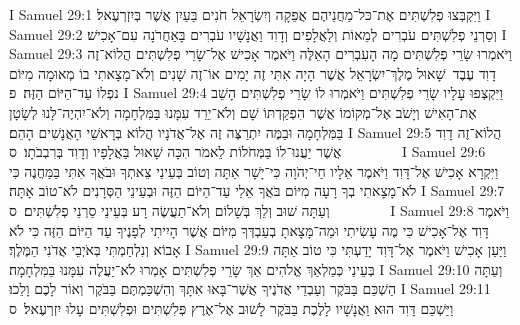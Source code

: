 I Samuel 29:1	וַיִּקְבְּצוּ פְלִשְׁתִּים אֶת־כּל־מַחֲנֵיהֶם אֲפֵקָה וְיִשְׂרָאֵל חֹנִים בַּעַיִן אֲשֶׁר בְּיִזְרְעֶאל׃
I Samuel 29:2	וְסַרְנֵי פְלִשְׁתִּים עֹבְרִים לְמֵאוֹת וְלַאֲלָפִים וְדָוִד וַאֲנָשָׁיו עֹבְרִים בָּאַחֲרֹנָה עִם־אָכִישׁ׃
I Samuel 29:3	וַיֹּאמְרוּ שָׂרֵי פְלִשְׁתִּים מָה הָעִבְרִים הָאֵלֶּה וַיֹּאמֶר אָכִישׁ אֶל־שָׂרֵי פְלִשְׁתִּים הֲלוֹא־זֶה דָוִד עֶבֶד  שָׁאוּל מֶלֶךְ־יִשְׂרָאֵל אֲשֶׁר הָיָה אִתִּי זֶה יָמִים אוֹ־זֶה שָׁנִים וְלֹא־מָצָאתִי בוֹ מְאוּמָה מִיּוֹם נפְלוֹ עַד־הַיּוֹם הַזֶּה׃ {פ}
I Samuel 29:4	וַיִּקְצְפוּ עָלָיו שָׂרֵי פְלִשְׁתִּים וַיֹּאמְרוּ לוֹ שָׂרֵי פְלִשְׁתִּים הָשֵׁב אֶת־הָאִישׁ וְיָשֹׁב אֶל־מְקוֹמוֹ אֲשֶׁר הִפְקַדְתּוֹ שָׁם וְלֹא־יֵרֵד עִמָּנוּ בַּמִּלְחָמָה וְלֹא־יִהְיֶה־לָּנוּ לְשָׂטָן בַּמִּלְחָמָה וּבַמֶּה יִתְרַצֶּה זֶה אֶל־אֲדֹנָיו הֲלוֹא בְּרָאשֵׁי הָאֲנָשִׁים הָהֵם׃
I Samuel 29:5	הֲלוֹא־זֶה דָוִד אֲשֶׁר יַעֲנוּ־לוֹ בַּמְּחֹלוֹת לֵאמֹר הִכָּה שָׁאוּל בַּאֲלָפָיו וְדָוִד בְּרִבְבֹתָו׃ {ס}        
I Samuel 29:6	וַיִּקְרָא אָכִישׁ אֶל־דָּוִד וַיֹּאמֶר אֵלָיו חַי־יְהֹוָה כִּי־יָשָׁר אַתָּה וְטוֹב בְּעֵינַי צֵאתְךָ וּבֹאֲךָ אִתִּי בַּמַּחֲנֶה כִּי לֹא־מָצָאתִי בְךָ רָעָה מִיּוֹם בֹּאֲךָ אֵלַי עַד־הַיּוֹם הַזֶּה וּבְעֵינֵי הַסְּרָנִים לֹא־טוֹב אָתָּה׃
I Samuel 29:7	וְעַתָּה שׁוּב וְלֵךְ בְּשָׁלוֹם וְלֹא־תַעֲשֶׂה רָע בְּעֵינֵי סַרְנֵי פְלִשְׁתִּים׃ {ס}        
I Samuel 29:8	וַיֹּאמֶר דָּוִד אֶל־אָכִישׁ כִּי מֶה עָשִׂיתִי וּמַה־מָּצָאתָ בְעַבְדְּךָ מִיּוֹם אֲשֶׁר הָיִיתִי לְפָנֶיךָ עַד הַיּוֹם הַזֶּה כִּי לֹא אָבוֹא וְנִלְחַמְתִּי בְּאֹיְבֵי אֲדֹנִי הַמֶּלֶךְ׃
I Samuel 29:9	וַיַּעַן אָכִישׁ וַיֹּאמֶר אֶל־דָּוִד יָדַעְתִּי כִּי טוֹב אַתָּה בְּעֵינַי כְּמַלְאַךְ אֱלֹהִים אַךְ שָׂרֵי פְלִשְׁתִּים אָמְרוּ לֹא־יַעֲלֶה עִמָּנוּ בַּמִּלְחָמָה׃
I Samuel 29:10	וְעַתָּה הַשְׁכֵּם בַּבֹּקֶר וְעַבְדֵי אֲדֹנֶיךָ אֲשֶׁר־בָּאוּ אִתָּךְ וְהִשְׁכַּמְתֶּם בַּבֹּקֶר וְאוֹר לָכֶם וָלֵכוּ׃
I Samuel 29:11	וַיַּשְׁכֵּם דָּוִד הוּא וַאֲנָשָׁיו לָלֶכֶת בַּבֹּקֶר לָשׁוּב אֶל־אֶרֶץ פְּלִשְׁתִּים וּפְלִשְׁתִּים עָלוּ יִזְרְעֶאל׃ {ס}        
